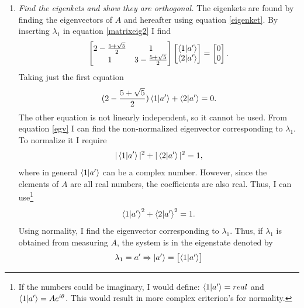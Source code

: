 \begin{example}
\begin{enumerate}
		\item \emph{Find the eigenkets and show they are orthogonal.}\newline
		The eigenkets are found by finding the eigenvectors of $A$ and hereafter using equation \eqref{eigenket}. By inserting $\lambda_1$ in equation \eqref{matrixeig2} I find
		\begin{equation}
			\begin{bmatrix}
				2-\frac{5+\sqrt{5}}{2} & 1\\
				1 & 3 -\frac{5+\sqrt{5}}{2}\\
			\end{bmatrix}
			\begin{bmatrix}
				\braket{1|a'}\\
				\braket{2|a'}\\
			\end{bmatrix}
			=\begin{bmatrix}
				0\\
				0\\
			\end{bmatrix}.
		\end{equation} 
		Taking just the first equation
		\begin{equation}
			(2-\frac{5+\sqrt{5}}{2})\braket{1|a'}+\braket{2|a'}=0.
			\label{egv}	
		\end{equation} 
		The other equation is not linearly independent, so it cannot be used. From equation \eqref{egv} I can find the non-normalized eigenvector corresponding to $\lambda_1$. To normalize it I require
		\begin{equation}
			|\braket{1|a'}|^2+|\braket{2|a'}|^2=1,
		\end{equation} 
		where in general $\braket{1|a'}$ can be a complex number. However, since the elements of $A$ are all real numbers, the coefficients are also real. Thus, I can use\footnote{If the numbers could be imaginary, I would define: $\braket{1|a'}=real$ and $\braket{1|a'}=Ae^{i\theta}$. This would result in more complex criterion's for normality.}
		\begin{equation}
			\braket{1|a'}^2+\braket{2|a'}^2=1.
		\end{equation} 
		Using normality, I find the eigenvector corresponding to $\lambda_1$. Thus, if $\lambda_1$ is obtained from measuring $A$, the system is in the eigenstate denoted by
		\begin{equation}
			\lambda_1=a'\Rightarrow
			\ket{a'}=\begin{bmatrix}
				\braket{1|a'}\\

\end{bmatrix}
\end{equation}
\end{enumerate}
\end{example}
